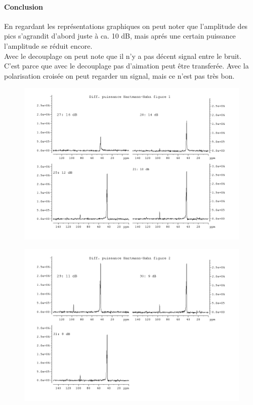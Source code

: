 \documentclass[a4paper,12pt]{scrartcl}
\begin{document}
  \paragraph{Conclusion}
En regardant les  représentations graphiques on peut noter que l'amplitude des pics s'agrandit d'abord juste à ca. 10 dB, mais aprés une certain puissance  l'amplitude se réduit encore.\\
Avec le decouplage on peut note que il n'y a pas décent signal entre le bruit. C'est parce que avec le decouplage pas d'aimation peut être transferée. Avec la polarisation croisée on peut regarder un signal, mais ce n'est pas très bon.
 \begin{figure}[H]
    \includegraphics[width=\textwidth]{bilder/figure5.png}
  \end{figure}
\begin{figure}[H]
    \includegraphics[width=\textwidth]{bilder/figure6.png}
  \end{figure}
\end{document}
